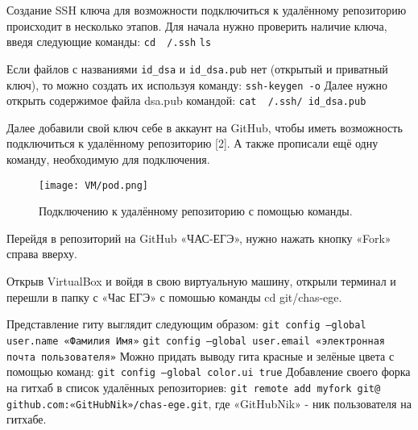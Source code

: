 Создание SSH ключа для возможности подключиться к удалённому репозиторию происходит в несколько этапов.
Для начала нужно проверить наличие ключа, введя следующие команды:
\newline \texttt{cd ~/.ssh}
\newline \texttt{ls}

Если файлов с названиями \texttt{id\_dsa} и \texttt{id\_dsa.pub} нет (открытый и приватный ключ), то можно создать их используя команду:
\newline  \texttt{ssh-keygen -o}
\newline \quad Далее нужно открыть содержимое файла dsa.pub командой:
\newline  \texttt{cat ~/.ssh/ id\_dsa.pub}

Далее добавили свой ключ себе в аккаунт на GitHub, чтобы иметь возможность подключиться к удалённому репозиторию [2]. А также прописали ещё одну команду, необходимую для подключения.

\begin{figure}[h]
		\centering
		\texttt{[image: VM/pod.png]}
\caption{Подключению к удалённому репозиторию с помощью команды.}
\label{ris:image}
\end{figure}

Перейдя в репозиторий на GitHub «ЧАС-ЕГЭ», нужно нажать кнопку «Fork» справа вверху.

Открыв VirtualBox и войдя в свою виртуальную машину, открыли терминал и перешли в папку с «Час ЕГЭ» с помошью команды cd git/chas-ege.

Представление гиту выглядит следующим образом:
\newline \texttt{git config --global user.name «Фамилия Имя»}
\newline \texttt{git config --global user.email «электронная почта пользователя»}
\newline Можно придать выводу гита красные и зелёные цвета с помощью команд:
\texttt{git config --global color.ui true}
\newline Добавление своего форка на гитхаб в список удалённых репозиториев:
\texttt{git remote add myfork git@ github.com:«GitHubNik»/chas-ege.git}, где «GitHubNik» - ник пользователя на гитхабе. 

